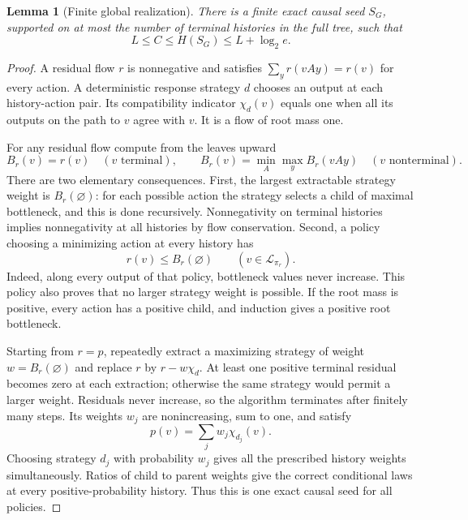 \documentclass[11pt,a4paper]{article}
\newtheorem{lemma}[theorem]{Lemma}
\begin{document}
\begin{lemma}[Finite global realization]\label{lem:realization}
There is a finite exact causal seed $S_G$, supported on at most the
number of terminal histories in the full tree, such that
\begin{equation}\label{eq:gap}
L\le C\le H(S_G)\le L+\log_2e.
\end{equation}
\end{lemma}
\begin{proof}
A residual flow $r$ is nonnegative and satisfies
$\sum_y r(vAy)=r(v)$ for every action. A deterministic response
strategy $d$ chooses an output at each history-action pair. Its
compatibility indicator $\chi_d(v)$ equals one when all its outputs
on the path to $v$ agree with $v$. It is a flow of root mass one.

For any residual flow compute from the leaves upward
\[
B_r(v)=r(v)\quad(v\text{ terminal}),\qquad
B_r(v)=\min_A\max_y B_r(vAy)\quad(v\text{ nonterminal}).
\]
There are two elementary consequences.
First, the largest extractable strategy weight is $B_r(\varnothing)$:
for each possible action the strategy selects a child of maximal
bottleneck, and this is done recursively. Nonnegativity on terminal
histories implies nonnegativity at all histories by flow conservation.
Second, a policy choosing a minimizing action at every history has
\[
r(v)\le B_r(\varnothing)\qquad(v\in\mathcal L_{\pi_r}).
\]
Indeed, along every output of that policy, bottleneck values never
increase. This policy also proves that no larger strategy weight is
possible. If the root mass is positive, every action has a positive
child, and induction gives a positive root bottleneck.

Starting from $r=p$, repeatedly extract a maximizing strategy of weight
$w=B_r(\varnothing)$ and replace $r$ by $r-w\chi_d$. At least one
positive terminal residual becomes zero at each extraction; otherwise
the same strategy would permit a larger weight. Residuals never
increase, so the algorithm terminates after finitely many steps. Its
weights $w_j$ are nonincreasing, sum to one, and satisfy
\begin{equation}\label{eq:decomp}
p(v)=\sum_jw_j\chi_{d_j}(v).
\end{equation}
Choosing strategy $d_j$ with probability $w_j$ gives all the prescribed
history weights simultaneously. Ratios of child to parent weights
give the correct conditional laws at every positive-probability history.
Thus this is one exact causal seed for all policies.


\end{proof}
\end{document}
